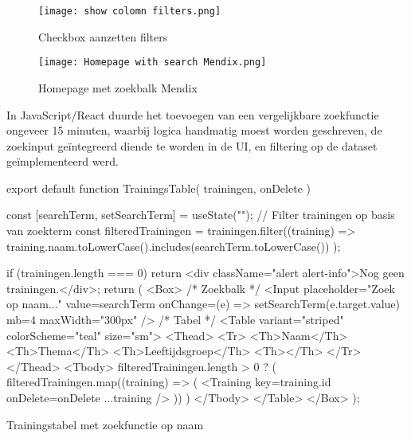 \begin{figure}[H]
    \centering
    \texttt{[image: show colomn filters.png]}
    \caption[\centering Checkbox aanzetten filters]{\label{fig:show-colomn-filters-Mendix} Checkbox aanzetten filters}
\end{figure}


\begin{figure}[H]
    \centering
    \texttt{[image: Homepage with search Mendix.png]}
    \caption[\centering Homepage with search bar]{\label{fig:homepage-with-search-Mendix} Homepage met zoekbalk Mendix}
\end{figure}



In JavaScript/React duurde het toevoegen van een vergelijkbare zoekfunctie ongeveer 15 minuten, waarbij logica handmatig moest worden geschreven, de zoekinput geïntegreerd diende te worden in de UI, en filtering op de dataset geïmplementeerd werd.

\begin{listing}[H]
        export default function TrainingsTable({ trainingen, onDelete }) {
            const [searchTerm, setSearchTerm] = useState("");
            // Filter trainingen op basis van zoekterm
            const filteredTrainingen = trainingen.filter((training) =>
            training.naam.toLowerCase().includes(searchTerm.toLowerCase())
            );
     
            if (trainingen.length === 0) {
                return <div className="alert alert-info">Nog geen trainingen.</div>;
            }
            return (
            <Box>
            {/* Zoekbalk */}
            <Input
            placeholder="Zoek op naam..."
            value={searchTerm}
            onChange={(e) => setSearchTerm(e.target.value)}
            mb={4}
            maxWidth="300px"
            />
            {/* Tabel */}
            <Table variant="striped" colorScheme="teal" size="sm">
            <Thead>
            <Tr>
            <Th>Naam</Th>
            <Th>Thema</Th>
            <Th>Leeftijdsgroep</Th>
            <Th></Th>
            </Tr>
            </Thead>
            <Tbody>
            {filteredTrainingen.length > 0 ? (
                filteredTrainingen.map((training) => (
                <Training key={training.id} onDelete={onDelete} {...training} />
                ))
                )}
            </Tbody>
            </Table>
            </Box>
            );
        }
    \caption{Trainingstabel met zoekfunctie op naam}
    \label{lst:pipeline-clone}
\end{listing}

